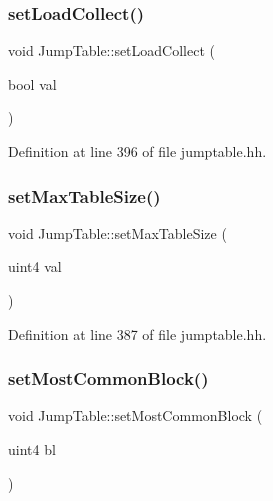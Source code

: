 \subsubsection{\texorpdfstring{setLoadCollect()}{setLoadCollect()}}
{\footnotesize\ttfamily void Jump\+Table\+::set\+Load\+Collect (\begin{DoxyParamCaption}\item[{bool}]{val }\end{DoxyParamCaption})\hspace{0.3cm}{\ttfamily [inline]}}



Definition at line 396 of file jumptable.\+hh.

\mbox{\label{class_jump_table_a402a16fcfbb3f1aa4e18e92e449299d0}} 
\subsubsection{\texorpdfstring{setMaxTableSize()}{setMaxTableSize()}}
{\footnotesize\ttfamily void Jump\+Table\+::set\+Max\+Table\+Size (\begin{DoxyParamCaption}\item[{uint4}]{val }\end{DoxyParamCaption})\hspace{0.3cm}{\ttfamily [inline]}}



Definition at line 387 of file jumptable.\+hh.

\mbox{\label{class_jump_table_ae0dbbb3a114d754264eb2b45ee243b32}} 
\subsubsection{\texorpdfstring{setMostCommonBlock()}{setMostCommonBlock()}}
{\footnotesize\ttfamily void Jump\+Table\+::set\+Most\+Common\+Block (\begin{DoxyParamCaption}\item[{uint4}]{bl }\end{DoxyParamCaption})\hspace{0.3cm}{\ttfamily [inline]}}



